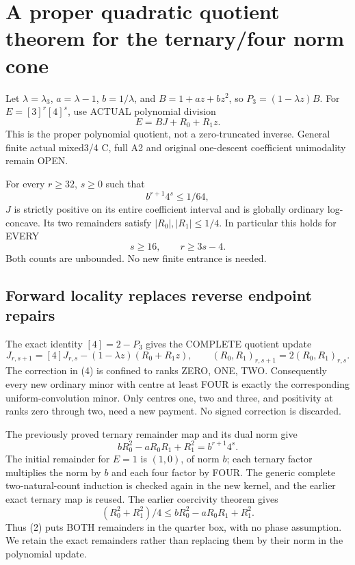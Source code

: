 \section{A proper quadratic quotient theorem for the ternary/four norm cone}
Let $\lambda=\lambda_3$, $a=\lambda-1$, $b=1/\lambda$, and
$B=1+az+bz^2$, so $P_3=(1-\lambda z)B$.
For $E=[3]^r[4]^s$, use ACTUAL polynomial division
\[
                   E=BJ+R_0+R_1z.                         \tag{1}
\]
This is the proper polynomial quotient, not a zero-truncated inverse.
General finite actual mixed3/4 C, full A2 and original one-descent
coefficient unimodality remain OPEN.

\begin{theorem}
For every $r\ge32$, $s\ge0$ such that
\[
                         b^{r+1}4^s\le1/64,              \tag{2}
\]
$J$ is strictly positive on its entire coefficient interval and is
globally ordinary log-concave. Its two remainders satisfy
$|R_0|,|R_1|\le1/4$. In particular this holds for EVERY
\[
                         s\ge16,\qquad r\ge3s-4.         \tag{3}
\]
Both counts are unbounded. No new finite entrance is needed.
\end{theorem}

\subsection{Forward locality replaces reverse endpoint repairs}
The exact identity $[4]=2-P_3$ gives the COMPLETE quotient update
\[
 J_{r,s+1}=[4]J_{r,s}-(1-\lambda z)(R_0+R_1z),\qquad
 (R_0,R_1)_{r,s+1}=2(R_0,R_1)_{r,s}.                      \tag{4}
\]
The correction in (4) is confined to ranks ZERO, ONE, TWO.
Consequently every new ordinary minor with centre at least FOUR is
exactly the corresponding uniform-convolution minor. Only centres
one, two and three, and positivity at ranks zero through two, need
a new payment. No signed correction is discarded.

The previously proved ternary remainder map and its dual norm give
\[
 bR_0^2-aR_0R_1+R_1^2=b^{r+1}4^s.                       \tag{5}
\]
The initial remainder for $E=1$ is $(1,0)$, of norm $b$;
each ternary factor multiplies the norm by $b$ and each four factor
by FOUR. The generic complete two-natural-count induction is checked
again in the new kernel, and the earlier exact ternary map is reused.
The earlier coercivity theorem gives
\[
 (R_0^2+R_1^2)/4\le bR_0^2-aR_0R_1+R_1^2.
\]
Thus (2) puts BOTH remainders in the quarter box, with no phase
assumption. We retain the exact remainders rather than replacing
them by their norm in the polynomial update.

